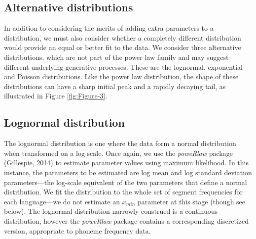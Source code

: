 \hypertarget{alternative-distributions}{%
\subsection*{Alternative distributions}\label{alternative-distributions}}

In addition to considering the merits of adding extra parameters to a distribution, we must also consider whether a completely different distribution would provide an equal or better fit to the data. We consider three alternative distributions, which are not part of the power law family and may suggest different underlying generative processes. These are the lognormal, exponential and Poisson distributions. Like the power law distribution, the shape of these distributions can have a sharp initial peak and a rapidly decaying tail, as illustrated in Figure \ref{fig:Figure-3}. \newline

\hypertarget{lognormal-distribution}{%
\subsection*{Lognormal distribution}\label{lognormal-distribution}}

The lognormal distribution is one where the data form a normal distribution when transformed on a log scale. Once again, we use the \emph{poweRlaw} package (Gillespie, 2014) to estimate parameter values using maximum likelihood. In this instance, the parameters to be estimated are log mean and log standard deviation parameters---the log-scale equivalent of the two parameters that define a normal distribution. We fit the distribution to the whole set of segment frequencies for each language---we do not estimate an \(x_{min}\) parameter at this stage (though see below). The lognormal distribution narrowly construed is a continuous distribution, however the \emph{poweRlaw} package contains a corresponding discretized version, appropriate to phoneme frequency data.

